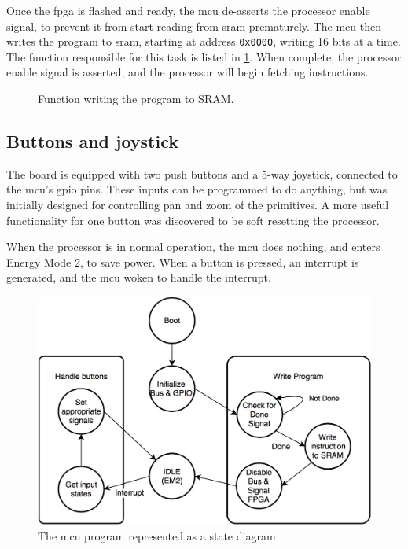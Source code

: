 Once the \gls{fpga} is flashed and ready, the \gls{mcu} de-asserts the processor enable signal, to prevent it from start reading from \gls{sram} prematurely.
The \gls{mcu} then writes the program to \gls{sram}, starting at address \texttt{0x0000}, writing 16 bits at a time. The function responsible for this task is listed in \ref{fig:write_program}.
When complete, the processor enable signal is asserted, and the processor will begin fetching instructions.

\begin{figure}
	\centering
	
	\label{fig:write_program}
	\caption{Function writing the program to SRAM.}
\end{figure}

\subsection{Buttons and joystick}
The board is equipped with two push buttons and a 5-way joystick, connected to the \gls{mcu}'s \gls{gpio} pins.
These inputs can be programmed to do anything, but was initially designed for controlling pan and zoom of the primitives.
A more useful functionality for one button was discovered to be soft resetting the processor.

When the processor is in normal operation, the \gls{mcu} does nothing, and enters Energy Mode 2, to save power.
When a button is pressed, an interrupt is generated, and the \gls{mcu} woken to handle the interrupt.

\begin{figure}[h!]
\centering \includegraphics[width = 0.75\linewidth]{images/MCU_state.png}
\caption{The \gls{mcu} program represented as a state diagram}
\label{fig:mcu_state}
\end{figure}
